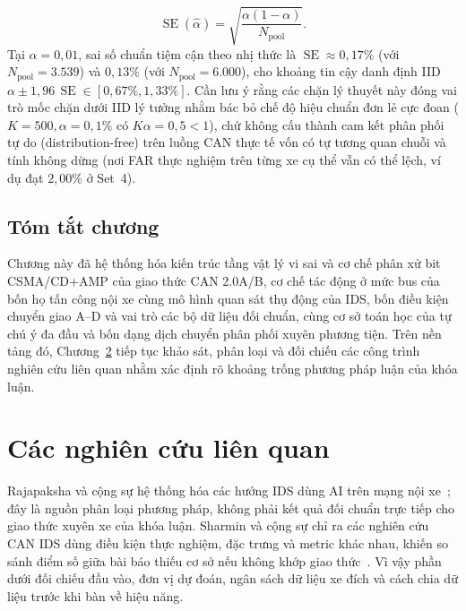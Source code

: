 \documentclass[12pt, a4paper, reqno, oneside]{book}
\begin{document}
\begin{enumerate}
    \begin{equation}\label{eq:binomial-se}
    \operatorname{SE}(\hat{\alpha}) = \sqrt{\frac{\alpha(1-\alpha)}{N_{\text{pool}}}}.
    \end{equation}
    Tại $\alpha = 0{,}01$, sai số chuẩn tiệm cận theo nhị thức là $\operatorname{SE} \approx 0{,}17\%$ (với $N_{\text{pool}}=3.539$) và $0{,}13\%$ (với $N_{\text{pool}}=6.000$), cho khoảng tin cậy danh định IID $\alpha \pm 1{,}96\,\operatorname{SE} \in [0{,}67\%, 1{,}33\%]$. Cần lưu ý rằng các chặn lý thuyết này đóng vai trò mốc chặn dưới IID lý tưởng nhằm bác bỏ chế độ hiệu chuẩn đơn lẻ cực đoan ($K=500, \alpha=0{,}1\%$ có $K\alpha = 0{,}5 < 1$), chứ không cấu thành cam kết phân phối tự do (distribution-free) trên luồng CAN thực tế vốn có tự tương quan chuỗi và tính không dừng (nơi FAR thực nghiệm trên từng xe cụ thể vẫn có thể lệch, ví dụ đạt $2{,}00\%$ ở Set~4).
\end{enumerate}



\section{Tóm tắt chương}
Chương này đã hệ thống hóa kiến trúc tầng vật lý vi sai và cơ chế phân xử bit CSMA/CD+AMP của giao thức CAN 2.0A/B, cơ chế tác động ở mức bus của bốn họ tấn công nội xe cùng mô hình quan sát thụ động của IDS, bốn điều kiện chuyển giao A--D và vai trò các bộ dữ liệu đối chuẩn, cùng cơ sở toán học của tự chú ý đa đầu và bốn dạng dịch chuyển phân phối xuyên phương tiện. Trên nền tảng đó, Chương~\ref{chap:related} tiếp tục khảo sát, phân loại và đối chiếu các công trình nghiên cứu liên quan nhằm xác định rõ khoảng trống phương pháp luận của khóa luận.

\chapter{Các nghiên cứu liên quan}\label{chap:related}
Rajapaksha và cộng sự hệ thống hóa các hướng IDS dùng AI trên mạng nội xe~\cite{rajapaksha2023survey}; đây là nguồn phân loại phương pháp, không phải kết quả đối chuẩn trực tiếp cho giao thức xuyên xe của khóa luận. Sharmin và cộng sự chỉ ra các nghiên cứu CAN IDS dùng điều kiện thực nghiệm, đặc trưng và metric khác nhau, khiến so sánh điểm số giữa bài báo thiếu cơ sở nếu không khớp giao thức~\cite{sharmin2024benchmark}. Vì vậy phần dưới đối chiếu đầu vào, đơn vị dự đoán, ngân sách dữ liệu xe đích và cách chia dữ liệu trước khi bàn về hiệu năng.
\end{document}
